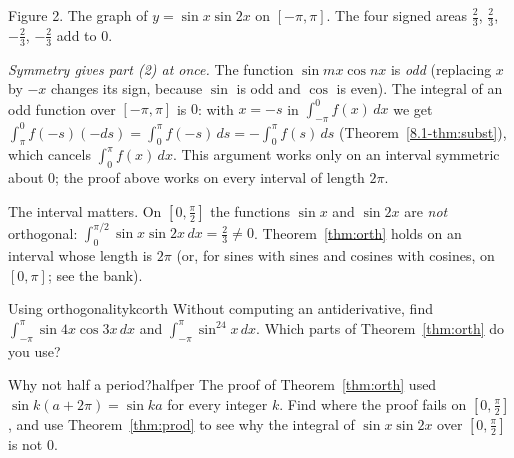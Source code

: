\documentclass[11pt]{article}
\begin{document}
\begin{center}\small Figure 2. The graph of $y=\sin x\sin2x$ on $[-\pi,\pi]$. The four signed areas $\frac23$, $\frac23$, $-\frac23$, $-\frac23$ add to $0$.\end{center}

\emph{Symmetry gives part (2) at once.} The function $\sin mx\cos nx$ is \emph{odd} (replacing $x$ by $-x$ changes its sign, because $\sin$ is odd and $\cos$ is even). The integral of an odd function over $[-\pi,\pi]$ is $0$: with $x=-s$ in $\int_{-\pi}^0f(x)\,dx$ we get $\int_{\pi}^{0}f(-s)(-ds)=\int_0^\pi f(-s)\,ds=-\int_0^\pi f(s)\,ds$ (Theorem~\ref{8.1-thm:subst}), which cancels $\int_0^\pi f(x)\,dx$. This argument works only on an interval symmetric about $0$; the proof above works on every interval of length $2\pi$.

\begin{warn}
The interval matters. On $\left[0,\frac\pi2\right]$ the functions $\sin x$ and $\sin2x$ are \emph{not} orthogonal: $\int_0^{\pi/2}\sin x\sin2x\,dx=\frac23\ne0$. Theorem~\ref{thm:orth} holds on an interval whose length is $2\pi$ (or, for sines with sines and cosines with cosines, on $[0,\pi]$; see the bank).
\end{warn}

\begin{kc}{Using orthogonality}{kcorth}
Without computing an antiderivative, find $\int_{-\pi}^{\pi}\sin4x\cos3x\,dx$ and $\int_{-\pi}^{\pi}\sin^24x\,dx$. Which parts of Theorem~\ref{thm:orth} do you use?
\end{kc}

\begin{think}{Why not half a period?}{halfper}
The proof of Theorem~\ref{thm:orth} used $\sin k(a+2\pi)=\sin ka$ for every integer $k$. Find where the proof fails on $\left[0,\frac\pi2\right]$, and use Theorem~\ref{thm:prod} to see why the integral of $\sin x\sin2x$ over $\left[0,\frac\pi2\right]$ is not $0$.
\end{think}
\end{document}
